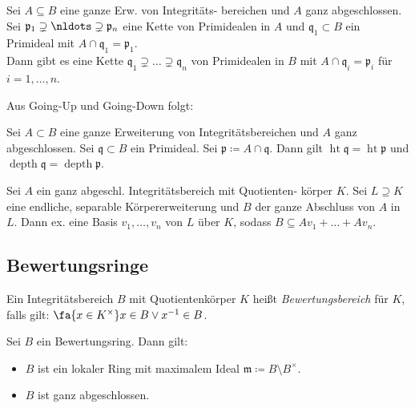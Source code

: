 \documentclass{cheat-sheet}
\DeclareMathOperator{\height}{ht} %
\DeclareMathOperator{\depth}{depth} %
\newcommand{\ppp}{\mathfrak{p}}
\newcommand{\qqq}{\mathfrak{q}}
\newcommand{\mmm}{\mathfrak{m}}
\begin{document}


\begin{satz}
  Sei $A \subseteq B$ eine ganze Erw. von Integritäts- bereichen und $A$ ganz abgeschlossen.
  Sei $\ppp_1 \supsetneq \nldots \supsetneq \ppp_n$ eine Kette von Primidealen in $A$ und $\qqq_1 \subset B$ ein Primideal mit $A \cap \qqq_1 = \ppp_1$. \\
  Dann gibt es eine Kette $\qqq_1 \supsetneq \ldots \supsetneq \qqq_n$ von Primidealen in $B$ mit $A \cap \qqq_i = \ppp_i$ für $i = 1, \ldots, n$.
\end{satz}

Aus Going-Up und Going-Down folgt:

\begin{lem}
  Sei $A \subset B$ eine ganze Erweiterung von Integritätsbereichen und $A$ ganz abgeschlossen.
  Sei $\qqq \subset B$ ein Primideal.
  Sei $\ppp \coloneqq A \cap \qqq$.
  Dann gilt \enspace
  $\height \qqq = \height \ppp$ und $\depth \qqq = \depth \ppp$.
\end{lem}

\begin{prop}
  Sei $A$ ein ganz abgeschl. Integritätsbereich mit Quotienten- körper $K$.
  Sei $L \supseteq K$ eine endliche, separable Körpererweiterung und $B$ der ganze Abschluss von $A$ in $L$.
  Dann ex. eine Basis $v_1, \ldots, v_n$ von $L$ über $K$, sodass $B \subseteq A v_1 + \ldots + A v_n$.
\end{prop}


\subsection{Bewertungsringe}


\begin{defn}
  Ein Integritätsbereich $B$ mit Quotientenkörper $K$ heißt \emph{Bewertungsbereich} für $K$, falls gilt: $\fa{x \in K^{\times}} x \in B \vee x^{-1} \in B$.
\end{defn}

\begin{prop}
  Sei $B$ ein Bewertungsring.
  Dann gilt:
  \begin{itemize}
    \item $B$ ist ein lokaler Ring mit maximalem Ideal $\mmm \coloneqq B \setminus B^{\times}$.
    \item $B$ ist ganz abgeschlossen.
  \end{itemize}
\end{prop}
\end{document}
